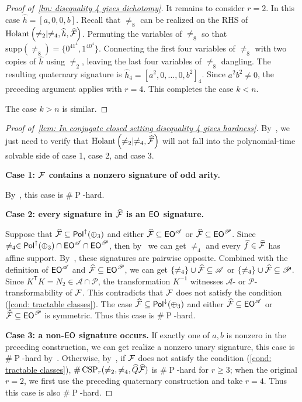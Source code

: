 \begin{proof}[Proof of~\cref{lm: disequality 4 gives dichotomy}]
    It remains to consider $r=2$. In this case $\widehat{h}=[a,0,0,b]$. Recall that $\neq_8$ can be realized on the RHS of $\operatorname{Holant}\left(\neq_2\mid \neq_4,\widehat{h},\widehat{\mathcal{F}}\right)$. Permuting the variables of $\neq_8$ so that $\mathrm{supp}(\neq_8)=\{0^41^4,1^40^4\}$.
    Connecting the first four variables of $\neq_8$ with two copies of $\widehat{h}$ using $\neq_2$, leaving the last four variables of $\neq_8$ dangling. The resulting quaternary signature is $\widehat{h}_4=[a^2,0,\dots,0,b^2]_4$. Since $a^2b^2\neq 0$, the preceding argument applies with $r=4$. This completes the case $k<n$.

    The case $k>n$ is similar.
\end{proof}


\ConjuDisFourHard*
\begin{proof}[Proof of~\cref{lem: In conjugate closed setting disequality 4 gives hardness}]
     By~, we just need to verify that $\operatorname{Holant}\left(\neq_2\mid \neq_4,\widehat{\mathcal{F}}\right)$ will not fall into the polynomial-time solvable side of case 1, case 2, and case 3.

     \textbf{Case 1: $\mathcal{F}$ contains a nonzero signature of odd arity.}

     By~, this case is $\#\operatorname{P}$-hard.

     \textbf{Case 2: every signature in $\widehat{\mathcal{F}}$ is an $\textup{\textsf{EO}}$ signature.}

     Suppose that $\widehat{\mathcal{F}}\subseteq\mathsf{Pol}^\uparrow(\oplus_3)$ and either $\widehat{\mathcal{F}}\subseteq \textup{\textsf{EO}}^{\mathscr{A}}$ or $\widehat{\mathcal{F}}\subseteq \textup{\textsf{EO}}^{\mathscr{P}}$. Since $\neq_4\in \mathsf{Pol}^\uparrow(\oplus_3)\cap\textup{\textsf{EO}}^{\mathscr{A}}\cap\textup{\textsf{EO}}^{\mathscr{P}}$, then by~ we can get $\neq_4$ and every $\widehat{f}\in\widehat{\mathcal{F}}$ has affine support. By~\cite{cai-fu-shao-eo}, these signatures are pairwise opposite. Combined with the definition of $\textup{\textsf{EO}}^{\mathscr{A}}$ and $\widehat{\mathcal{F}}\subseteq \textup{\textsf{EO}}^{\mathscr{P}}$, we can get $\{\neq_4\}\cup \widehat{\mathcal{F}}\subseteq \mathscr{A}$ or $\{\neq_4\}\cup\widehat{\mathcal{F}}\subseteq\mathscr{P}$. Since $K^{\mathsf T}K=N_2\in\mathscr{A}\cap\mathscr{P}$, the transformation $K^{-1}$ witnesses $\mathscr{A}$- or $\mathscr{P}$-transformability of $\mathcal{F}$. This contradicts that $\mathcal{F}$ does not satisfy the condition \rm{(\ref{cond: tractable classes})}. The case $\widehat{\mathcal{F}}\subseteq\mathsf{Pol}^\downarrow(\oplus_3)$ and either $\widehat{\mathcal{F}}\subseteq \textup{\textsf{EO}}^{\mathscr{A}}$ or $\widehat{\mathcal{F}}\subseteq \textup{\textsf{EO}}^{\mathscr{P}}$ is symmetric. Thus this case is $\#\operatorname{P}$-hard.
     

     \textbf{Case 3: a non-$\textup{\textsf{EO}}$ signature occurs.}
     If exactly one of $a,b$ is nonzero in the preceding construction, we can get realize a nonzero unary signature, this case is $\#\operatorname{P}$-hard by~. Otherwise, by~\cite{odd_holant_real}, if $\mathcal{F}$ does not satisfy the condition \rm{(\ref{cond: tractable classes})}, $\#\operatorname{CSP}_r(\neq_2,\neq_4,\widehat{Q}\widehat{\mathcal{F}})$ is $\#\operatorname{P}$-hard for $r\geq 3$; when the original $r=2$, we first use the preceding quaternary construction and take $r=4$. Thus this case is also $\#\operatorname{P}$-hard.
\end{proof}

